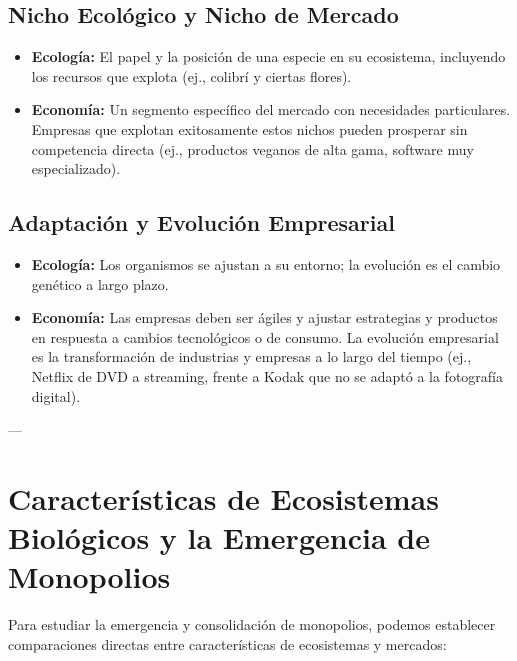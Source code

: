 \documentclass{article}
\begin{document}
\subsection{Nicho Ecológico y Nicho de Mercado}
\begin{itemize}
    \item \textbf{Ecología:} El papel y la posición de una especie en su ecosistema, incluyendo los recursos que explota (ej., colibrí y ciertas flores).
    \item \textbf{Economía:} Un segmento específico del mercado con necesidades particulares. Empresas que explotan exitosamente estos nichos pueden prosperar sin competencia directa (ej., productos veganos de alta gama, software muy especializado).
\end{itemize}

\subsection{Adaptación y Evolución Empresarial}
\begin{itemize}
    \item \textbf{Ecología:} Los organismos se ajustan a su entorno; la evolución es el cambio genético a largo plazo.
    \item \textbf{Economía:} Las empresas deben ser ágiles y ajustar estrategias y productos en respuesta a cambios tecnológicos o de consumo. La evolución empresarial es la transformación de industrias y empresas a lo largo del tiempo (ej., Netflix de DVD a streaming, frente a Kodak que no se adaptó a la fotografía digital).
\end{itemize}

---

\section{Características de Ecosistemas Biológicos y la Emergencia de Monopolios}

Para estudiar la emergencia y consolidación de monopolios, podemos establecer comparaciones directas entre características de ecosistemas y mercados:
\end{document}

